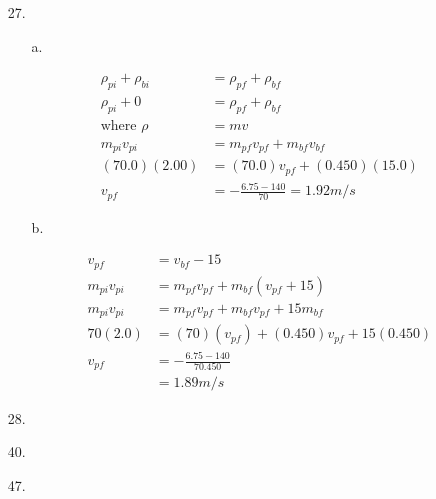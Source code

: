     \begin{itemize}
        \item [27.]
        
        \begin{itemize}
            \item [a.]
            
            \begin{align*}
                \rho_{pi} + \rho_{bi}   & = \rho_{pf} + \rho_{bf}       \\
                \rho_{pi} + 0           & = \rho_{pf} + \rho_{bf}       \\
                \text{where } \rho      & = mv                          \\
                m_{pi}v_{pi}            & = m_{pf}v_{pf} + m_{bf}v_{bf} \\
                (70.0)(2.00)            & = (70.0)v_{pf} + (0.450)(15.0)\\
                v_{pf}                  & = -\frac{6.75-140}{70} = \boxed{1.92m/s}
            \end{align*}

            \item [b.]
            
            \begin{align*}
                v_{pf}                  & = v_{bf} - 15                 \\
                m_{pi}v_{pi}            & = m_{pf}v_{pf} 
                                          + m_{bf}(v_{pf} + 15)         \\
                m_{pi}v_{pi}            & = m_{pf}v_{pf} 
                                          + m_{bf}v_{pf} + 15m_{bf}     \\
                70(2.0)                 & = (70)(v_{pf}) + (0.450)v_{pf}
                                          + 15(0.450)                   \\
                v_{pf}                  & = -\frac{6.75 - 140}{70.450}  \\
                                        & = \boxed{1.89 m/s}
            \end{align*}
        \end{itemize}

        \item [28.]
        
        

        \item [40.]
        \item [47.]
    \end{itemize}

